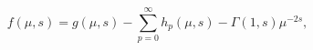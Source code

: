 \begin{equation}
    \label{fmu}
    f(\mu,s) = g(\mu,s) -\sum_{p=0}^{\infty} h_p(\mu,s) -
    \Gamma(1,s) \mu^{-2s},
\end{equation}

